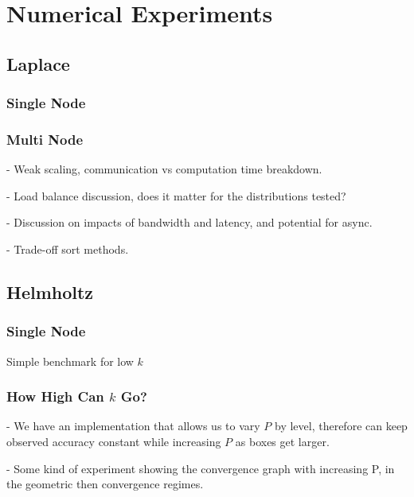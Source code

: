 \chapter{Numerical Experiments}\label{chpt:experiments}
\thispagestyle{chaptertitle} %


\section{Laplace}\label{experiments:sec:laplace}
\subsection{Single Node}\label{chpt:experiments:sec:laplace:sub:single_node}

\subsection{Multi Node}\label{chpt:experiments:sec:laplace:sub:multi_node}

- Weak scaling, communication vs computation time breakdown.

- Load balance discussion, does it matter for the distributions tested?

- Discussion on impacts of bandwidth and latency, and potential for async.

- Trade-off sort methods.


\section{Helmholtz}\label{chpt:experiments:sec:helmholtz}

\subsection{Single Node}\label{chpt:experiments:sec:helmholtz:sub:single_node}

Simple benchmark for low $k$

\subsection{How High Can $k$ Go?}\label{chpt:experiments:sec:helmholtz:sub:high_k}

- We have an implementation that allows us to vary $P$ by level, therefore can keep observed accuracy constant while increasing $P$ as boxes get larger.

- Some kind of experiment showing the convergence graph with increasing P, in the geometric then convergence regimes.

